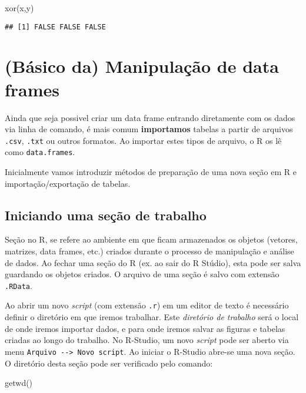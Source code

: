 \documentclass[
]{book}
\newenvironment{Shaded}{\begin{snugshade}}{\end{snugshade}}
\newcommand{\FunctionTok}[1]{\textcolor[rgb]{0.00,0.00,0.00}{#1}}
\newcommand{\NormalTok}[1]{#1}
\begin{document}
\begin{Shaded}
\begin{Highlighting}[]
\FunctionTok{xor}\NormalTok{(x,y)}
\end{Highlighting}
\end{Shaded}

\begin{verbatim}
## [1] FALSE FALSE FALSE
\end{verbatim}

\hypertarget{manipulacao}{%
\chapter{(Básico da) Manipulação de data frames}\label{manipulacao}}

Ainda que seja possivel criar um data frame entrando diretamente com os dados via linha de comando, é mais comum \textbf{importamos} tabelas a partir de arquivos \texttt{.csv}, \texttt{.txt} ou outros formatos. Ao importar estes tipos de arquivo, o R os lê como \texttt{data.frames}.

Inicialmente vamos introduzir métodos de preparação de uma nova seção em R e importação/exportação de tabelas.

\hypertarget{iniciando-uma-seuxe7uxe3o-de-trabalho}{%
\section{Iniciando uma seção de trabalho}\label{iniciando-uma-seuxe7uxe3o-de-trabalho}}

Seção no R, se refere ao ambiente em que ficam armazenados os objetos (vetores, matrizes, data frames, etc.) criados durante o processo de manipulação e análise de dados. Ao fechar uma seção do R (ex. ao sair do R Stúdio), esta pode ser salva guardando os objetos criados. O arquivo de uma seção é salvo com extensão \texttt{.RData}.

Ao abrir um novo \emph{script} (com extensão \texttt{.r}) em um editor de texto é necessário definir o diretório em que iremos trabalhar. Este \emph{diretório de trabalho} será o local de onde iremos importar dados, e para onde iremos salvar as figuras e tabelas criadas ao longo do trabalho. No R-Studio, um novo \emph{script} pode ser aberto via menu \texttt{Arquivo\ -\/-\textgreater{}\ Novo\ script}. Ao iniciar o R-Studio abre-se uma nova seção. O diretório desta seção pode ser verificado pelo comando:

\begin{Shaded}
\begin{Highlighting}[]
\FunctionTok{getwd}\NormalTok{()}
\end{Highlighting}
\end{Shaded}
\end{document}
